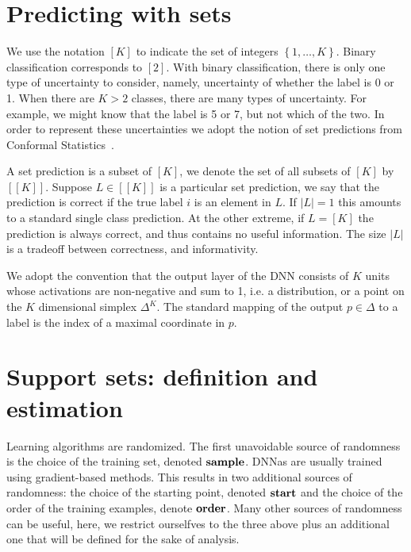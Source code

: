 \documentclass{article}
\begin{document}
\section{Predicting with sets}

We use the notation $[K]$ to indicate the set of integers $\left\{
1,\ldots,K \right\}$.  Binary classification corresponds to $[2]$.
With binary classification, there is only one type of uncertainty to
consider, namely, uncertainty of whether the label is 0 or 1.  When
there are $K>2$ classes, there are many types of uncertainty. For
example, we might know that the label is 5 or 7, but not which of the
two. In order to represent these uncertainties we adopt the notion of
set predictions from Conformal Statistics~\cite{VovkConformalPrediction}. 

A set prediction is a subset of $[K]$, we denote the set of all
subsets of $[K]$ by $[[K]]$. Suppose $L \in [[K]]$ is a particular set
prediction, we say that the prediction is correct if the true label
$i$ is an element in $L$. If $|L|=1$ this amounts to a standard single
class prediction. At the other extreme, if $L=[K]$ the prediction is
always correct, and thus contains no useful information. The size $|L|$ is a tradeoff between
correctness, and informativity.

We adopt the convention that the output layer of the DNN consists of
$K$ units whose activations are non-negative and sum to 1, i.e. a
distribution, or a point on the $K$ dimensional simplex
$\Delta^K$. The standard mapping of the output $p \in \Delta$ to a
label is the index of a maximal coordinate in $p$.




\section{Support sets: definition and estimation}
\label{sec:SupportSet}

\newcommand{\sample}{\mbox{\bf sample}}
\newcommand{\start}{\mbox{\bf start}}
\newcommand{\order}{\mbox{\bf order}}
\newcommand{\cover}{\mbox{\bf cover}}

Learning algorithms are randomized. The first unavoidable source of
randomness is the choice of the training set, denoted $\sample$. DNNas
are usually trained using gradient-based methods. This results in two
additional sources of randomness: the choice of the starting point,
denoted $\start$ and the choice of the order of the training examples,
denote $\order$. Many other sources of randomness can be useful, here,
we restrict ourselfves to the three above plus an additional one that
will be defined for the sake of analysis.
\end{document}

